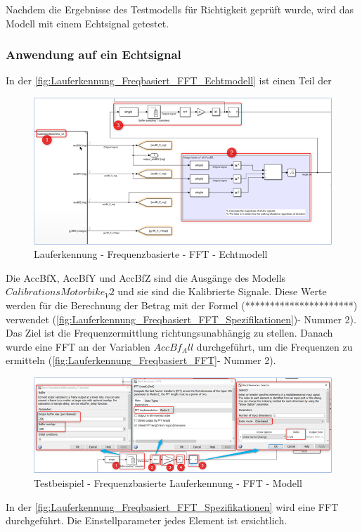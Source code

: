 Nachdem die Ergebnisse des Testmodells für Richtigkeit geprüft wurde, wird das Modell mit einem Echtsignal getestet. 

\subsubsection{Anwendung auf ein Echtsignal}


In der \autoref{fig:Lauferkennung_Freqbasiert_FFT_Echtmodell} ist einen Teil der


\begin{figure}[H]
	\centering
	\includegraphics[width=\linewidth]{Bilder/Lauferkennung_Freqbasiert_FFT.png}
	\caption{Lauferkennung - Frequenzbasierte - FFT - Echtmodell}
	\label{fig:Lauferkennung_Freqbasiert_FFT_Echtmodell}
\end{figure}

Die AccBfX, AccBfY und AccBfZ sind die Ausgänge des Modells $CalibrationsMotorbike_V2$ und sie sind die Kalibrierte Signale.
Diese Werte werden für die Berechnung der Betrag mit der Formel (**********************)
verwendet (\autoref{fig:Lauferkennung_Freqbasiert_FFT_Spezifikationen})- Nummer 2). Das Ziel ist die Frequenzermittlung richtungsunabhängig zu stellen.
Danach wurde eine FFT an der Variablen $AccBf_All$ durchgeführt, um die Frequenzen zu ermitteln (\autoref{fig:Lauferkennung_Freqbasiert_FFT}- Nummer 2).


\begin{figure}[H]
	\centering
	\includegraphics[width=\linewidth]{Bilder/Lauferkennung_Freqbasiert_FFT_Spezifikationen.png}
	\caption{Testbeispiel - Frequenzbasierte Lauferkennung - FFT - Modell}
	\label{fig:Lauferkennung_Freqbasiert_FFT_Spezifikationen}
\end{figure}
In der \autoref{fig:Lauferkennung_Freqbasiert_FFT_Spezifikationen} wird eine FFT durchgeführt. Die Einstellparameter jedes Element ist ersichtlich.

